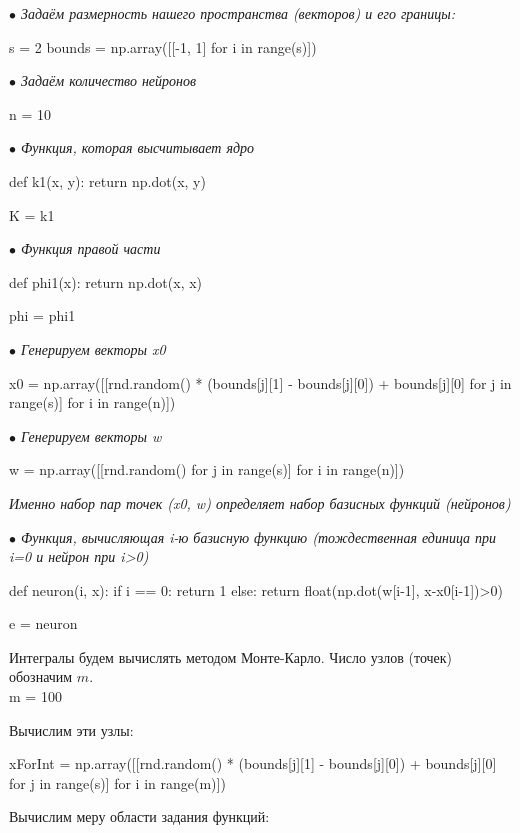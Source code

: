 \documentclass[12pt]{article}
\begin{document}
\textit{$ \bullet $ Задаём размерность нашего пространства (векторов) и его границы:} \vskip 0.3cm

s = 2 \vskip 0.3cm
bounds = np.array([[-1, 1] for i in range(s)]) \vskip 0.3cm

\textit{$ \bullet $     Задаём количество нейронов} \vskip 0.3cm

n = 10 \vskip 0.3cm

\textit{$ \bullet $                                         Функция, которая высчитывает ядро} \vskip 0.3cm

def k1(x, y): \vskip 0.3cm
return np.dot(x, y)  \vskip 0.3cm

K = k1 \vskip 0.3cm

\textit{$ \bullet $  Функция правой части} \vskip 0.3cm

def phi1(x): \vskip 0.3cm
return np.dot(x, x) \vskip 0.3cm

phi = phi1 \vskip 0.3cm

\textit{$ \bullet $  Генерируем векторы x0} \vskip 0.3cm

x0 = np.array([[rnd.random() * (bounds[j][1] - bounds[j][0]) + bounds[j][0] for j in range(s)] for i in range(n)]) \vskip 0.3cm

\textit{$ \bullet $      Генерируем векторы w} \vskip 0.3cm

w = np.array([[rnd.random() for j in range(s)] 
for i in range(n)]) \vskip 0.3cm

\textit{Именно набор пар точек (x0, w) определяет набор базисных функций (нейронов) } \vskip 0.3cm

\textit{$ \bullet $                               Функция, вычисляющая i-ю базисную функцию (тождественная единица при i=0 и нейрон при i>0) } \vskip 0.3cm

def neuron(i, x):  \vskip 0.3cm          
if i == 0: \vskip 0.3cm
return 1 \vskip 0.3cm
else:  \vskip 0.3cm
return float(np.dot(w[i-1], x-x0[i-1])>0) \vskip 0.3cm

e = neuron \vskip 0.3cm

Интегралы будем вычислять методом Монте-Карло. Число узлов (точек) обозначим $m$. \\

m = 100 \vskip 0.3cm

Вычислим эти узлы: \vskip 0.3cm

xForInt = np.array([[rnd.random() * (bounds[j][1] - bounds[j][0]) + bounds[j][0] for j in range(s)] 
for i in range(m)]) \vskip 0.3cm

Вычислим меру области задания функций: \vskip 0.3cm
\end{document}
